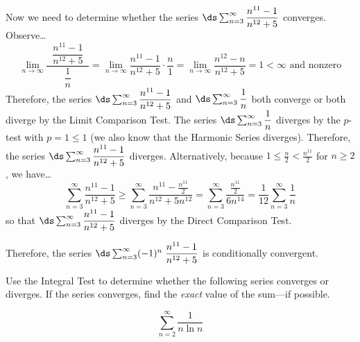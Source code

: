 \documentclass[12pt,letterpaper]{exam}
\begin{document}
\begin{questions}
{Now we need to determine whether the series $\ds\sum_{n=3}^\infty \dfrac{n^{11} - 1}{n^{12} + 5}$ converges. Observe\dots
	\[
	\lim_{n \to \infty} \dfrac{\;\;\dfrac{n^{11} - 1}{n^{12} + 5}\;\;}{\dfrac{1}{n}}= \lim_{n \to \infty} \dfrac{n^{11} - 1}{n^{12} + 5} \cdot \dfrac{n}{1}= \lim_{n \to \infty} \dfrac{n^{12} - n}{n^{12} + 5}= 1 < \infty \text{ and nonzero}
	\]
Therefore, the series $\ds\sum_{n=3}^\infty \dfrac{n^{11} - 1}{n^{12} + 5}$ and $\ds\sum_{n=3}^\infty \dfrac{1}{n}$ both converge or both diverge by the Limit Comparison Test. The series $\ds\sum_{n=3}^\infty \dfrac{1}{n}$ diverges by the $p$-test with $p= 1 \leq 1$ (we also know that the Harmonic Series diverges). Therefore, the series $\ds\sum_{n=3}^\infty \dfrac{n^{11} - 1}{n^{12} + 5}$ diverges. Alternatively, because $1 \leq \frac{n}{2} < \frac{n^{11}}{2}$ for $n \geq 2$, we have\dots
	\[
	\sum_{n=3}^\infty \dfrac{n^{11} - 1}{n^{12} + 5} \geq \sum_{n=3}^\infty \dfrac{n^{11} - \tfrac{n^{11}}{2}}{n^{12} + 5n^{12}}= \sum_{n=3}^\infty \dfrac{\tfrac{n^{11}}{2}}{6n^{14}}= \dfrac{1}{12} \sum_{n=3}^\infty \dfrac{1}{n}
	\]
so that $\ds\sum_{n=3}^\infty \dfrac{n^{11} - 1}{n^{12} + 5}$ diverges by the Direct Comparison Test. 

Therefore, the series $\ds\sum_{n=3}^\infty (-1)^n \; \dfrac{n^{11} - 1}{n^{12} + 5}$ is conditionally convergent.}



\newpage
\question[18] Use the Integral Test to determine whether the following series converges or diverges. If the series converges, find the \textit{exact} value of the sum---if possible. \par\vspace{0.3cm}
	\[
	\sum_{n=2}^\infty \dfrac{1}{n \ln n}
	\]

\end{questions}
\end{document}
